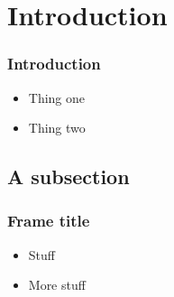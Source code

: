 

\section{Introduction}
\label{report}


\begin{frame}
	\frametitle{Introduction}
	\begin{itemize}
		\item Thing one \pause
		\item Thing two \pause
	\end{itemize}

\end{frame}


\subsection{A subsection}

\begin{frame}
	\frametitle{Frame title}
	\begin{itemize}
		\item Stuff \pause
		\item More stuff \pause
	\end{itemize}

\end{frame}


